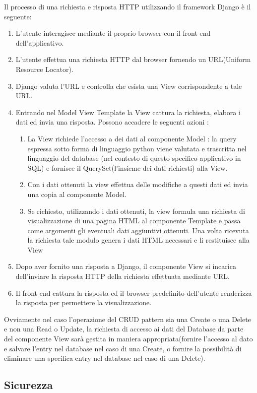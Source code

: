 Il processo di una richiesta e risposta HTTP utilizzando il framework Django è il seguente:
\begin{enumerate}
    \item L'utente interagisce mediante il proprio browser con il front-end dell'applicativo.
    \item L'utente effettua una richiesta HTTP dal browser fornendo un URL(Uniform Resource Locator). 
    \item Django valuta l'URL e controlla che esista una View corrispondente a tale URL. 
    \item Entrando nel Model View Template la View cattura la richiesta, elabora i dati ed invia una risposta. Possono accadere le seguenti azioni :
    \begin{enumerate}
        \item La View richiede l'accesso a dei dati al componente Model : la query espressa sotto forma di linguaggio python viene valutata e trascritta nel linguaggio del database (nel contesto di questo specifico applicativo in SQL) e fornisce il QuerySet(l'insieme dei dati richiesti) alla View.
        \item Con i dati ottenuti la view effettua delle modifiche a questi dati ed invia una copia al componente Model. 
        \item Se richiesto, utilizzando i dati ottenuti, la view formula una richiesta di visualizzazione di una pagina HTML al componente Template e passa come argomenti gli eventuali dati aggiuntivi ottenuti. Una volta ricevuta la richiesta tale modulo genera i dati HTML necessari e li restituisce alla View
    \end{enumerate}
    \item Dopo aver fornito una risposta a Django, il componente View si incarica dell'inviare la risposta HTTP della richiesta effettuata mediante URL.
    \item Il front-end cattura la risposta ed il browser predefinito dell'utente renderizza la risposta per permettere la visualizzazione.
\end{enumerate}

Ovviamente nel caso l'operazione del CRUD pattern sia una Create o una Delete e non una Read o Update, la richiesta di accesso ai dati del Database da parte del componente View sarà gestita in maniera appropriata(fornire l'accesso al dato e salvare l'entry nel database nel caso di una Create, o fornire la possibilità di eliminare una specifica entry nel database nel caso di una Delete).
\subsection{Sicurezza}

